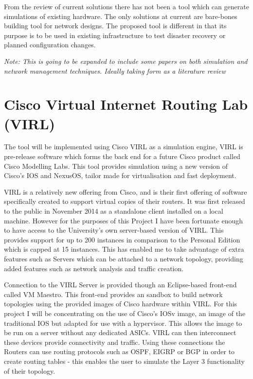 \documentclass[11pt]{report}
\begin{document}
From the review of current solutions there has not been a tool which can generate simulations of existing hardware. The only solutions at current are bare-bones building tool for network designs. The proposed tool is different in that its purpose is to be used in existing infrastructure to test disaster recovery or planned configuration changes.

\textit{Note: This is going to be expanded to include some papers on both simulation and network management techniques. Ideally taking form as a literature review}

\section{Cisco Virtual Internet Routing Lab (VIRL)}

The tool will be implemented using Cisco VIRL as a simulation engine, VIRL is pre-release software which forms the back end for a future Cisco product called Cisco Modelling Labs. This tool provides simulation using a new version of Cisco’s IOS and NexusOS, tailor made for virtualisation and fast deployment.

VIRL is a relatively new offering from Cisco, and is their first offering of software specifically created to support virtual copies of their routers. It was first released to the public in November 2014 as a standalone client installed on a local machine. However for the purposes of this Project I have been fortunate enough to have access to the University's own server-based version of VIRL. This provides support for up to 200 instances in comparison to the Personal Edition which is capped at 15 instances. This has enabled me to take advantage of extra features such as Servers which can be attached to a network topology, providing added features such as network analysis and traffic creation.

Connection to the VIRL Server is provided though an Eclipse-based front-end called VM Maestro. This front-end provides an sandbox to build network topologies using the provided images of Cisco hardware within VIRL. For this project I will be concentrating on the use of Cisco's IOSv image, an image of the traditional IOS but adapted for use with a hypervisor. This allows the image to be run on a server without any dedicated ASICs. VIRL can then interconnect these devices provide connectivity and traffic. Using these connections the Routers can use routing protocols such as OSPF, EIGRP or BGP in order to create routing tables - this enables the user to simulate the Layer 3 functionality of their topology.
\end{document}
